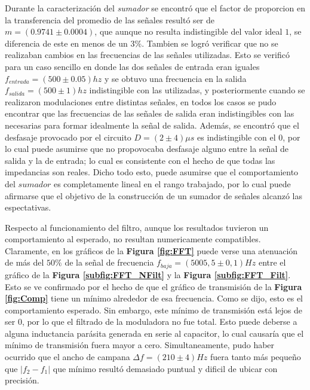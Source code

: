 \documentclass[11pt,a4paper]{article}
\begin{document}
Durante la caracterización del \textit{sumador} se encontró que el factor de proporcion en la transferencia del promedio de las señales resultó ser de $m = (0.9741 \pm 0.0004)$, que aunque no resulta indistingible del valor ideal $1$, se diferencia de este en menos de un 3\%. Tambien se logró verificar que no se realizaban cambios en las frecuencias de las señales utilizadas. Esto se verificó para un caso sencillo en donde las dos señales de entrada eran iguales $f_{entrada}= (500 \pm 0.05)hz$ y se obtuvo una frecuencia en la salida $f_{salida} = (500 \pm 1)hz$ indistingible con las utilizadas, y posteriormente cuando se realizaron modulaciones entre distintas señales, en todos los casos se pudo encontrar que las frecuencias de las señales de salida eran indistingibles con las necesarias para formar idealmente la señal de salida. Además, se encontró que el desfasaje provocado por el circuito $D= (2\pm 4) \mu s$ es indistingible con el 0, por lo cual puede asumirse que no propovocaba desfasaje alguno entre la señal de salida y la de entrada; lo cual es consistente con el hecho de que todas las impedancias son reales. Dicho todo esto, puede asumirse que el comportamiento del $sumador$ es completamente lineal en el rango trabajado, por lo cual puede afirmarse que el objetivo de la construcción de un sumador de señales alcanzó las espectativas.

Respecto al funcionamiento del filtro, aunque los resultados tuvieron un comportamiento al esperado, no resultan numericamente compatibles. Claramente, en los gráficos de la \textbf{Figura \ref{fig:FFT}} puede verse una atenuación de más del 
$50\%$ de la señal de frecuencia $f_{baja} = (5005,5 \pm 0,1)Hz$ entre el gráfico de la \textbf{Figura \ref{subfig:FFT_NFilt}} y la \textbf{Figura \ref{subfig:FFT_Filt}}. Esto se ve confirmado por el hecho de que el gráfico de transmisión de la \textbf{Figura \ref{fig:Comp}} tiene un mínimo alrededor de esa frecuencia. Como se dijo, esto es el comportamiento esperado. Sin embargo, este mínimo de transmisión está lejos de ser $0$, por lo que el filtrado de la moduladora no fue total. Esto puede deberse a alguna inductancia parásita generada en serie al capacitor, lo cual causaría que el mínimo de transmisión fuera mayor a cero. Simultaneamente, pudo haber ocurrido que el ancho de campana $\Delta f = (210 \pm 4)Hz$ fuera tanto más pequeño que $|f_2-f_1|$ que mínimo resultó demasiado puntual y dificil de ubicar con precisión.



\end{document}
